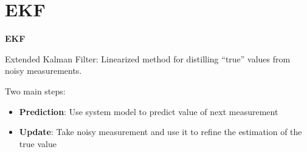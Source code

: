 \documentclass[xcolor=dvipsnames]{beamer}
\begin{document}
  {
  \begin{frame}{}
  \end{frame}
  }

  {
  \begin{frame}{}
  \end{frame}
  }

  \section{EKF}
  \begin{frame}{\bf EKF}

    Extended Kalman Filter: Linearized method for distilling ``true''
    values from noisy measurements.
    
    Two main steps:
    \begin{itemize}
    \item {\bf Prediction}: Use system model to predict value of next
    measurement
    \item {\bf Update}: Take noisy measurement and use it to refine the
      estimation of the true value
    \end{itemize}
    
  \end{frame}
\end{document}
